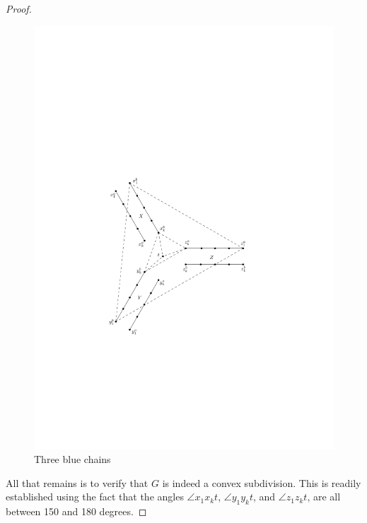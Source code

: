 \documentclass{elsarticle}
\begin{document}
\begin{proof}
\begin{figure}[ht]
  \centering
  \includegraphics{pics/3blue.pdf}
  \caption{Three blue chains}
  \label{fig:3blue}
\end{figure}

All that remains is to verify that $G$ is indeed a convex subdivision.  This is
readily established using the fact that the angles $\angle x_1 x_k t$, $\angle y_1 y_k t$, and $\angle z_1 z_k t$, are all between 150 and 180 degrees.
%
%
%
%
%
%
\end{proof}
\end{document}
